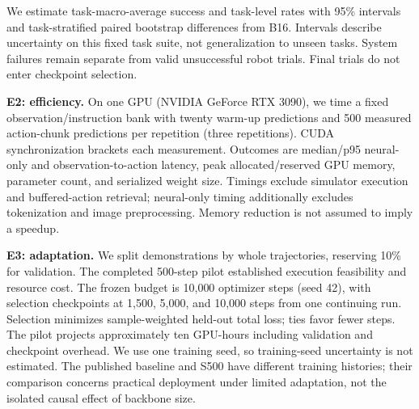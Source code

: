 \documentclass[10pt,a4paper]{article}
\begin{document}
We estimate task-macro-average success and task-level rates with 95\% intervals and task-stratified paired bootstrap differences from B16. Intervals describe uncertainty on this fixed task suite, not generalization to unseen tasks. System failures remain separate from valid unsuccessful robot trials. Final trials do not enter checkpoint selection.

\textbf{E2: efficiency.} On one GPU (NVIDIA GeForce RTX 3090), we time a fixed observation/instruction bank with twenty warm-up predictions and 500 measured action-chunk predictions per repetition (three repetitions). CUDA synchronization brackets each measurement. Outcomes are median/p95 neural-only and observation-to-action latency, peak allocated/reserved GPU memory, parameter count, and serialized weight size. Timings exclude simulator execution and buffered-action retrieval; neural-only timing additionally excludes tokenization and image preprocessing. Memory reduction is not assumed to imply a speedup.

\textbf{E3: adaptation.} We split demonstrations by whole trajectories, reserving 10\% for validation. The completed 500-step pilot established execution feasibility and resource cost. The frozen budget is 10,000 optimizer steps (seed 42), with selection checkpoints at 1,500, 5,000, and 10,000 steps from one continuing run. Selection minimizes sample-weighted held-out total loss; ties favor fewer steps. The pilot projects approximately ten GPU-hours including validation and checkpoint overhead. We use one training seed, so training-seed uncertainty is not estimated. The published baseline and S500 have different training histories; their comparison concerns practical deployment under limited adaptation, not the isolated causal effect of backbone size.
\end{document}

